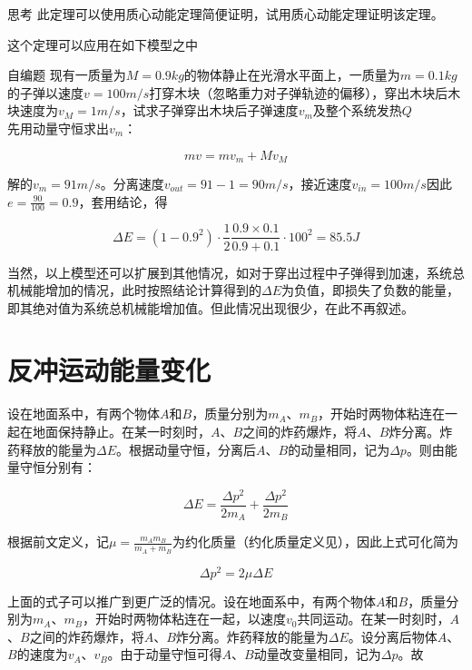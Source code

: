 \begin{mk}{思考}{}
此定理可以使用质心动能定理简便证明，试用质心动能定理证明该定理。
\end{mk}

这个定理可以应用在如下模型之中

\begin{ep}{自编题}{}
现有一质量为$M=0.9kg$的物体静止在光滑水平面上，一质量为$m=0.1kg$的子弹以速度$v=100m/s$打穿木块（忽略重力对子弹轨迹的偏移），穿出木块后木块速度为$v_M = 1m/s$，试求子弹穿出木块后子弹速度$v_m$及整个系统发热$Q$
~\\

先用动量守恒求出$v_m$：

$$m v = m v_m + M v_M$$

解的$v_m = 91m/s$。分离速度$v_{out} =  91 - 1 = 90m/s$，接近速度$v_{in} = 100m/s$因此$e = \frac{90}{100} = 0.9$，套用结论，得

$$\Delta E = (1 - 0.9^2) \cdot \frac{1}{2} \frac{0.9 \times 0.1}{0.9 + 0.1} \cdot 100^2 = 85.5J$$
\end{ep}

当然，以上模型还可以扩展到其他情况，如对于穿出过程中子弹得到加速，系统总机械能增加的情况，此时按照结论计算得到的$\Delta E$为负值，即损失了负数的能量，即其绝对值为系统总机械能增加值。但此情况出现很少，在此不再叙述。

\section{反冲运动能量变化}

设在地面系中，有两个物体$A$和$B$，质量分别为$m_A$、$m_B$，开始时两物体粘连在一起在地面保持静止。在某一时刻时，$A$、$B$之间的炸药爆炸，将$A$、$B$炸分离。炸药释放的能量为$\Delta E$。根据动量守恒，分离后$A$、$B$的动量相同，记为$\Delta p$。则由能量守恒分别有：

$$\Delta E = \frac{\Delta p^2}{2 m_A} + \frac{\Delta p^2}{2 m_B}$$

根据前文定义，记$\mu = \frac{m_A m_B}{m_A + m_B}$为约化质量（约化质量定义见），因此上式可化简为

$$\Delta p^2 = 2 \mu \Delta E$$

上面的式子可以推广到更广泛的情况。设在地面系中，有两个物体$A$和$B$，质量分别为$m_A$、$m_B$，开始时两物体粘连在一起，以速度$v_0$共同运动。在某一时刻时，$A$、$B$之间的炸药爆炸，将$A$、$B$炸分离。炸药释放的能量为$\Delta E$。设分离后物体$A$、$B$的速度为$v_A$、$v_B$。由于动量守恒可得$A$、$B$动量改变量相同，记为$\Delta p$。故

